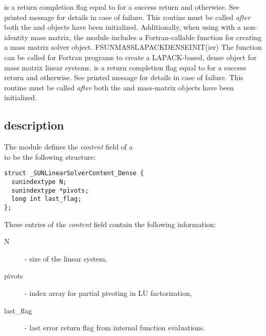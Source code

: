 {
   is a return completion flag equal to  for a success
  return and  otherwise. See printed message for details in case
  of failure.
}
{
  This routine must be
  called \emph{after} both the {\nvector} and {\sunmatrix} objects have
  been initialized.
}
Additionally, when using {\arkode} with a non-identity
mass matrix, the {\sunlinsollapdense} module includes a Fortran-callable
function for creating a  mass matrix solver
object.
{
  FSUNMASSLAPACKDENSEINIT(ier)
}
{
  The function  can be called for Fortran programs
  to create a LAPACK-based, dense  object for mass
  matrix linear systems.
}
{
}
{
   is a  return completion flag equal to  for a success
  return and  otherwise. See printed message for details in case
  of failure.
}
{
  This routine must be
  called \emph{after} both the {\nvector} and {\sunmatrix} mass-matrix
  objects have been initialized.
}


\subsection{{\sunlinsollapdense} description}\label{ss:sunlinsol_lapdense_description}

The {\sunlinsollapdense} module defines the {\em
content} field of a \\
\noindent{} to be the following structure:
\begin{verbatim} 
struct _SUNLinearSolverContent_Dense {
  sunindextype N;
  sunindextype *pivots;
  long int last_flag;
};
\end{verbatim}
These entries of the \emph{content} field contain the following
information:
\begin{description}
  \item[N] - size of the linear system,
  \item[pivots] - index array for partial pivoting in LU factorization,
  \item[last\_flag] - last error return flag from internal function evaluations.
\end{description}

